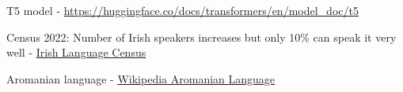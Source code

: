 \documentclass[11pt]{article}
\begin{document}
T5 model - \href{https://huggingface.co/docs/transformers/en/model\_doc/t5}{https://huggingface.co/docs/transformers/en/model\_doc/t5}

Census 2022: Number of Irish speakers increases but only 10\% can speak it very well - \href{https://www.irishtimes.com/ireland/2023/05/30/census-2022-number-of-irish-speakers-increases-but-only-10-can-speak-it-very-well/}{Irish Language Census}

Aromanian language - \href{https://en.wikipedia.org/wiki/Aromanian_language}{Wikipedia Aromanian Language}
\end{document}
